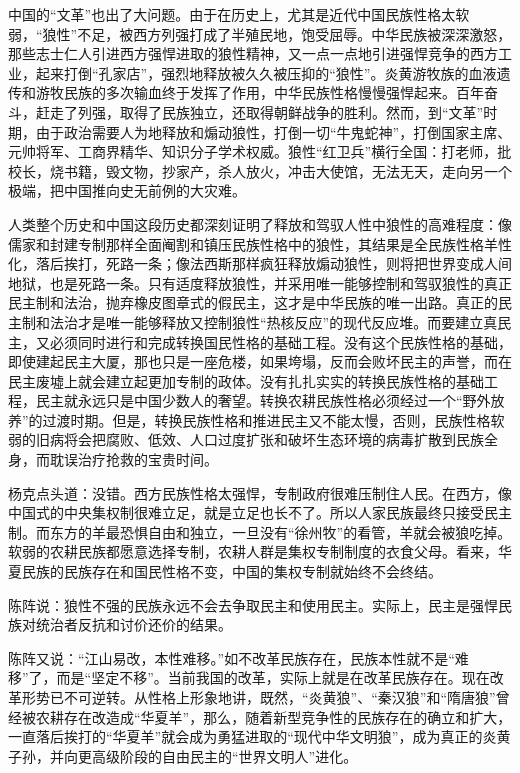 \par 中国的“文革”也出了大问题。由于在历史上，尤其是近代中国民族性格太软弱，“狼性”不足，被西方列强打成了半殖民地，饱受屈辱。中华民族被深深激怒，那些志士仁人引进西方强悍进取的狼性精神，又一点一点地引进强悍竞争的西方工业，起来打倒“孔家店”，强烈地释放被久久被压抑的“狼性”。炎黄游牧族的血液遗传和游牧民族的多次输血终于发挥了作用，中华民族性格慢慢强悍起来。百年奋斗，赶走了列强，取得了民族独立，还取得朝鲜战争的胜利。然而，到“文革”时期，由于政治需要人为地释放和煽动狼性，打倒一切“牛鬼蛇神”，打倒国家主席、元帅将军、工商界精华、知识分子学术权威。狼性“红卫兵”横行全国：打老师，批校长，烧书籍，毁文物，抄家产，杀人放火，冲击大使馆，无法无天，走向另一个极端，把中国推向史无前例的大灾难。
\par 人类整个历史和中国这段历史都深刻证明了释放和驾驭人性中狼性的高难程度：像儒家和封建专制那样全面阉割和镇压民族性格中的狼性，其结果是全民族性格羊性化，落后挨打，死路一条；像法西斯那样疯狂释放煽动狼性，则将把世界变成人间地狱，也是死路一条。只有适度释放狼性，并采用唯一能够控制和驾驭狼性的真正民主制和法治，抛弃橡皮图章式的假民主，这才是中华民族的唯一出路。真正的民主制和法治才是唯一能够释放又控制狼性“热核反应”的现代反应堆。而要建立真民主，又必须同时进行和完成转换国民性格的基础工程。没有这个民族性格的基础，即使建起民主大厦，那也只是一座危楼，如果垮塌，反而会败坏民主的声誉，而在民主废墟上就会建立起更加专制的政体。没有扎扎实实的转换民族性格的基础工程，民主就永远只是中国少数人的奢望。转换农耕民族性格必须经过一个“野外放养”的过渡时期。但是，转换民族性格和推进民主又不能太慢，否则，民族性格软弱的旧病将会把腐败、低效、人口过度扩张和破坏生态环境的病毒扩散到民族全身，而耽误治疗抢救的宝贵时间。
\par 杨克点头道：没错。西方民族性格太强悍，专制政府很难压制住人民。在西方，像中国式的中央集权制很难立足，就是立足也长不了。所以人家民族最终只接受民主制。而东方的羊最恐惧自由和独立，一旦没有“徐州牧”的看管，羊就会被狼吃掉。软弱的农耕民族都愿意选择专制，农耕人群是集权专制制度的衣食父母。看来，华夏民族的民族存在和国民性格不变，中国的集权专制就始终不会终结。
\par 陈阵说：狼性不强的民族永远不会去争取民主和使用民主。实际上，民主是强悍民族对统治者反抗和讨价还价的结果。
\par 陈阵又说：“江山易改，本性难移。”如不改革民族存在，民族本性就不是“难移”了，而是“坚定不移”。当前我国的改革，实际上就是在改革民族存在。现在改革形势已不可逆转。从性格上形象地讲，既然，“炎黄狼”、“秦汉狼”和“隋唐狼”曾经被农耕存在改造成“华夏羊”，那么，随着新型竞争性的民族存在的确立和扩大，一直落后挨打的“华夏羊”就会成为勇猛进取的“现代中华文明狼”，成为真正的炎黄子孙，并向更高级阶段的自由民主的“世界文明人”进化。
